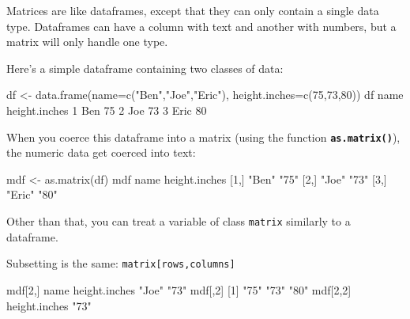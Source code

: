 \documentclass[
]{book}
\newenvironment{Shaded}{\begin{snugshade}}{\end{snugshade}}
\newcommand{\AttributeTok}[1]{\textcolor[rgb]{0.77,0.63,0.00}{#1}}
\newcommand{\DecValTok}[1]{\textcolor[rgb]{0.00,0.00,0.81}{#1}}
\newcommand{\FunctionTok}[1]{\textcolor[rgb]{0.00,0.00,0.00}{#1}}
\newcommand{\NormalTok}[1]{#1}
\newcommand{\OtherTok}[1]{\textcolor[rgb]{0.56,0.35,0.01}{#1}}
\newcommand{\StringTok}[1]{\textcolor[rgb]{0.31,0.60,0.02}{#1}}
\begin{document}
Matrices are like dataframes, except that they can only contain a single data type. Dataframes can have a column with text and another with numbers, but a matrix will only handle one type.

Here's a simple dataframe containing two classes of data:

\begin{Shaded}
\begin{Highlighting}[]
\NormalTok{df }\OtherTok{\textless{}{-}} \FunctionTok{data.frame}\NormalTok{(}\AttributeTok{name=}\FunctionTok{c}\NormalTok{(}\StringTok{"Ben"}\NormalTok{,}\StringTok{"Joe"}\NormalTok{,}\StringTok{"Eric"}\NormalTok{),}
                 \AttributeTok{height.inches=}\FunctionTok{c}\NormalTok{(}\DecValTok{75}\NormalTok{,}\DecValTok{73}\NormalTok{,}\DecValTok{80}\NormalTok{))}
\NormalTok{df}
\NormalTok{  name height.inches}
\DecValTok{1}\NormalTok{  Ben            }\DecValTok{75}
\DecValTok{2}\NormalTok{  Joe            }\DecValTok{73}
\DecValTok{3}\NormalTok{ Eric            }\DecValTok{80}
\end{Highlighting}
\end{Shaded}

When you coerce this dataframe into a matrix (using the function \textbf{\texttt{as.matrix()}}), the numeric data get coerced into text:

\begin{Shaded}
\begin{Highlighting}[]
\NormalTok{mdf }\OtherTok{\textless{}{-}} \FunctionTok{as.matrix}\NormalTok{(df)}
\NormalTok{mdf}
\NormalTok{     name   height.inches}
\NormalTok{[}\DecValTok{1}\NormalTok{,] }\StringTok{"Ben"}  \StringTok{"75"}         
\NormalTok{[}\DecValTok{2}\NormalTok{,] }\StringTok{"Joe"}  \StringTok{"73"}         
\NormalTok{[}\DecValTok{3}\NormalTok{,] }\StringTok{"Eric"} \StringTok{"80"}         
\end{Highlighting}
\end{Shaded}

Other than that, you can treat a variable of class \texttt{matrix} similarly to a dataframe.

Subsetting is the same: \texttt{matrix{[}rows,columns{]}}

\begin{Shaded}
\begin{Highlighting}[]
\NormalTok{mdf[}\DecValTok{2}\NormalTok{,]}
\NormalTok{         name height.inches }
        \StringTok{"Joe"}          \StringTok{"73"} 
\NormalTok{mdf[,}\DecValTok{2}\NormalTok{]}
\NormalTok{[}\DecValTok{1}\NormalTok{] }\StringTok{"75"} \StringTok{"73"} \StringTok{"80"}
\NormalTok{mdf[}\DecValTok{2}\NormalTok{,}\DecValTok{2}\NormalTok{]}
\NormalTok{height.inches }
         \StringTok{"73"} 
\end{Highlighting}
\end{Shaded}
\end{document}
